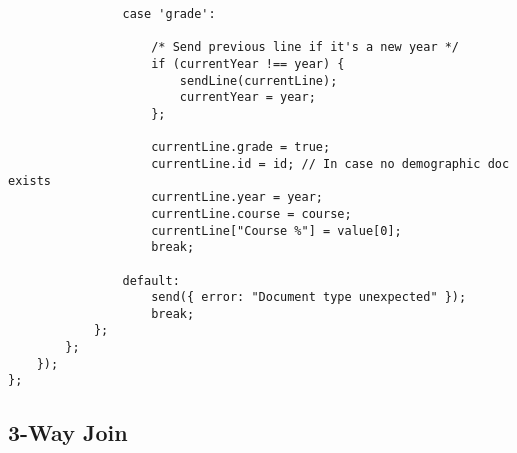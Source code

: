 \begin{verbatim}
                case 'grade':

                    /* Send previous line if it's a new year */
                    if (currentYear !== year) {
                        sendLine(currentLine);
                        currentYear = year;
                    };

                    currentLine.grade = true;
                    currentLine.id = id; // In case no demographic doc exists
                    currentLine.year = year;
                    currentLine.course = course;
                    currentLine["Course %"] = value[0];
                    break;

                default:
                    send({ error: "Document type unexpected" });
                    break;
            };
        };
    });
};
\end{verbatim}

\subsection{3-Way Join}
